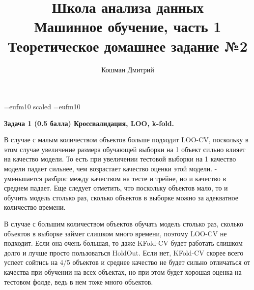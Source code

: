 \documentclass[10pt]{article}
\title{Школа анализа данных\\Машинное обучение, часть 1\\Теоретическое домашнее задание №2}
\author{Кошман Дмитрий}
\date{}
\begin{document}
	
	
	\voffset=-20mm
	\hoffset=-17mm
	\font\Got=eufm10 scaled \font\Got=eufm10
	
	
	\maketitle
	
	\bigskip
	
	\textbf{Задача 1 (0.5 балла) Кроссвалидация, LOO, k-fold.}
	

	В случае с малым количеством объектов больше подходит LOO-CV, поскольку в этом случае увеличение размера обучающей
	выборки на 1 объект сильно влияет на качество модели. То есть при увеличении тестовой выборки на 1 качество модели
	падает сильнее, чем возрастает качество оценки этой модели. - уменьшается разброс между качеством на тесте и трейне, но
	и качество в среднем падает. Еще следует отметить, что поскольку объектов мало, то и обучить модель столько раз, сколько объектов в выборке можно за адекватное количество времени.
	
	В случае с большим количеством объектов обучать модель столько раз, сколько объектов в выборке займет слишком много времени, поэтому LOO-CV не подходит. Если она очень большая, то даже KFold-CV будет работать слишком долго и лучше просто пользоваться HoldOut. Если нет, KFold-CV скорее всего успеет сойтись на 4/5 объектов и среднее качество не будет сильно отличаться от качества при обучении на всех объектах, но при этом будет хорошая оценка на тестовом фолде, ведь в нем тоже много объектов.
	
	\bigskip
	
\end{document}
